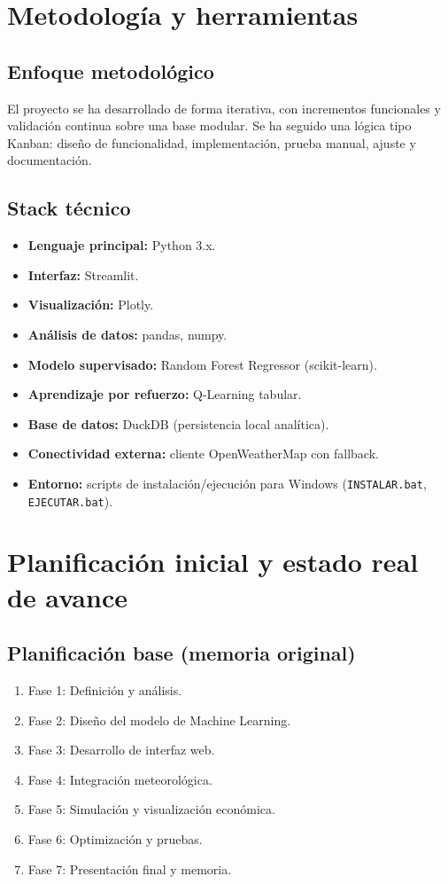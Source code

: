 \documentclass[12pt,a4paper]{article}
\begin{document}
\section{Metodolog\'ia y herramientas}
\subsection{Enfoque metodol\'ogico}
El proyecto se ha desarrollado de forma iterativa, con incrementos funcionales y validaci\'on continua sobre una base modular. Se ha seguido una l\'ogica tipo Kanban: dise\~no de funcionalidad, implementaci\'on, prueba manual, ajuste y documentaci\'on.

\subsection{Stack t\'ecnico}
\begin{itemize}
    \item \textbf{Lenguaje principal:} Python 3.x.
    \item \textbf{Interfaz:} Streamlit.
    \item \textbf{Visualizaci\'on:} Plotly.
    \item \textbf{An\'alisis de datos:} pandas, numpy.
    \item \textbf{Modelo supervisado:} Random Forest Regressor (scikit-learn).
    \item \textbf{Aprendizaje por refuerzo:} Q-Learning tabular.
    \item \textbf{Base de datos:} DuckDB (persistencia local anal\'itica).
    \item \textbf{Conectividad externa:} cliente OpenWeatherMap con fallback.
    \item \textbf{Entorno:} scripts de instalaci\'on/ejecuci\'on para Windows (\texttt{INSTALAR.bat}, \texttt{EJECUTAR.bat}).
\end{itemize}

\section{Planificaci\'on inicial y estado real de avance}
\subsection{Planificaci\'on base (memoria original)}
\begin{enumerate}
    \item Fase 1: Definici\'on y an\'alisis.
    \item Fase 2: Dise\~no del modelo de Machine Learning.
    \item Fase 3: Desarrollo de interfaz web.
    \item Fase 4: Integraci\'on meteorol\'ogica.
    \item Fase 5: Simulaci\'on y visualizaci\'on econ\'omica.
    \item Fase 6: Optimizaci\'on y pruebas.
    \item Fase 7: Presentaci\'on final y memoria.
\end{enumerate}
\end{document}
